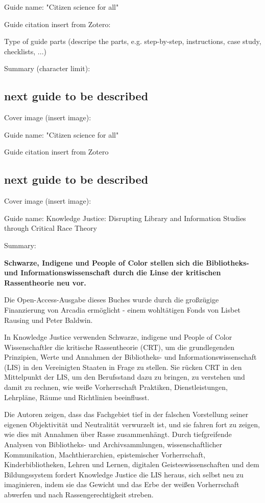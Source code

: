 \documentclass{article}
\begin{document}
Guide name: "Citizen science for all"


Guide citation insert from Zotero: \autocite{noauthor_citizen_2016}\autocite{pocock_choosing_2014}


Type of guide parts (descripe the parts, e.g. step-by-step, instructions, case study, checklists, ...)


Summary (character limit): 


\subsection{next guide to be described}\label{H7212092}



Cover image (insert image):


Guide name: "Citizen science for all"


Guide citation insert from Zotero \autocite{pocock_choosing_2014}  


\subsection{next guide to be described}\label{H9362108}



Cover image (insert image):


Guide name: Knowledge Justice: Disrupting Library and Information Studies through Critical Race Theory


Summary: 


\textbf{Schwarze, Indigene und People of Color stellen sich die Bibliotheks- und Informationswissenschaft durch die Linse der kritischen Rassentheorie neu vor.}


Die Open-Access-Ausgabe dieses Buches wurde durch die großzügige Finanzierung von Arcadia ermöglicht - einem wohltätigen Fonds von Lisbet Rausing und Peter Baldwin.


In Knowledge Justice verwenden Schwarze, indigene und People of Color Wissenschaftler die kritische Rassentheorie (CRT), um die grundlegenden Prinzipien, Werte und Annahmen der Bibliotheks- und Informationswissenschaft (LIS) in den Vereinigten Staaten in Frage zu stellen. Sie rücken CRT in den Mittelpunkt der LIS, um den Berufsstand dazu zu bringen, zu verstehen und damit zu rechnen, wie weiße Vorherrschaft Praktiken, Dienstleistungen, Lehrpläne, Räume und Richtlinien beeinflusst.


Die Autoren zeigen, dass das Fachgebiet tief in der falschen Vorstellung seiner eigenen Objektivität und Neutralität verwurzelt ist, und sie fahren fort zu zeigen, wie dies mit Annahmen über Rasse zusammenhängt. Durch tiefgreifende Analysen von Bibliotheks- und Archivsammlungen, wissenschaftlicher Kommunikation, Machthierarchien, epistemischer Vorherrschaft, Kinderbibliotheken, Lehren und Lernen, digitalen Geisteswissenschaften und dem Bildungssystem fordert Knowledge Justice die LIS heraus, sich selbst neu zu imaginieren, indem sie das Gewicht und das Erbe der weißen Vorherrschaft abwerfen und nach Rassengerechtigkeit streben.


\printbibliography[title={Literaturverzeichnis}]
\end{document}
